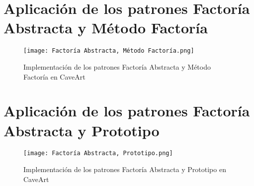 \section{Aplicación de los patrones Factoría Abstracta y Método Factoría}

\begin{figure}[h!]
\begin{center}
	\texttt{[image: Factoría Abstracta, Método Factoría.png]}
\end{center}
\caption{Implementación de los patrones Factoría Abstracta y Método Factoría en CaveArt}
\end{figure}

\section{Aplicación de los patrones Factoría Abstracta y Prototipo}

\begin{figure}[h!]
\begin{center}
	\texttt{[image: Factoría Abstracta, Prototipo.png]}
\end{center}
\caption{Implementación de los patrones Factoría Abstracta y Prototipo en CaveArt}
\end{figure}

